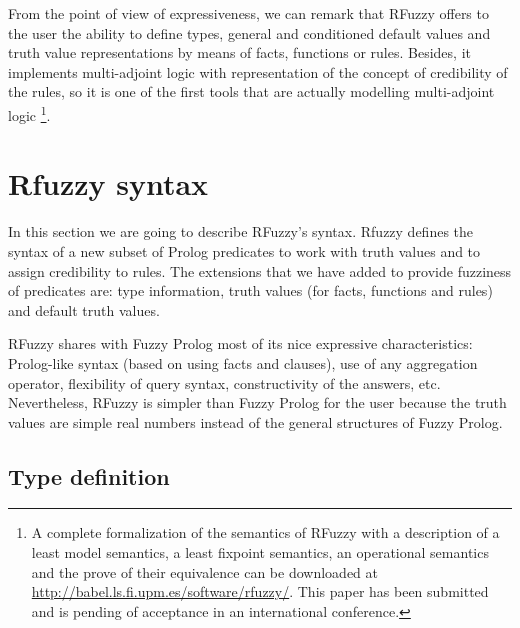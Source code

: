 \documentclass[runningheads,a4paper]{llncs}
\begin{document}
From the point of view of expressiveness, we can remark that RFuzzy offers
to the user the ability to define types, general and conditioned
default values and truth value representations by means of facts,
functions or rules. 
Besides, it implements multi-adjoint logic with
representation of the concept of credibility of the rules, so it is one of the first tools that are actually modelling multi-adjoint logic
\footnote{A complete formalization of the semantics of RFuzzy with a
  description of a least model semantics, a least fixpoint semantics,
  an operational semantics and the prove of their equivalence 
  can be downloaded at 
  \url{http://babel.ls.fi.upm.es/software/rfuzzy/}.
  This paper has been submitted and is pending of
  acceptance in an international conference.}.
 


\section{Rfuzzy syntax}
\label{rfuzzy:syntax}

In this section we are going to describe RFuzzy's syntax.
Rfuzzy defines the syntax of a new subset of Prolog predicates 
to work with truth values and to assign credibility to rules. 
The extensions that we have added to provide fuzziness of 
predicates are:
type information, truth values (for facts, functions and rules) 
and default truth values.
 
RFuzzy shares with Fuzzy Prolog most of its nice
expressive characteristics: Prolog-like syntax (based on using facts
and clauses), use of any aggregation operator, flexibility of query
syntax, constructivity of the answers, etc. Nevertheless, RFuzzy is
simpler than Fuzzy Prolog for the user because the truth values are
simple real numbers instead of the general structures of Fuzzy Prolog.


\subsection{Type definition}
\label{type-definition}
\end{document}
